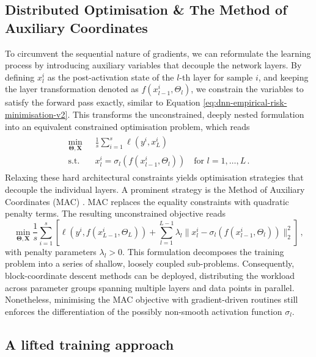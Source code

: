 \subsection{Distributed Optimisation \& The Method of Auxiliary Coordinates}
To circumvent the sequential nature of gradients, we can reformulate the learning process by introducing auxiliary variables that decouple the network layers. By defining $x_l^i$ as the post-activation state of the $l$-th layer for sample $i$, and keeping the layer transformation denoted as $f(x_{l-1}^i, \Theta_l)$, we constrain the variables to satisfy the forward pass exactly, similar to Equation \eqref{eq:dnn-empirical-risk-minimisation-v2}. This transforms the unconstrained, deeply nested formulation into an equivalent constrained optimisation problem, which reads
\begin{align}
    \begin{split}
    \min_{\mathbf{\Theta}, \mathbf{X}} \, &\frac{1}{s}\sum_{i=1}^s \ell(y^i, x_L^i) \\
    \text{s.t.} \quad &x_l^i = \sigma_l(f(x_{l-1}^i, \Theta_l)) \quad \text{for } l = 1, \ldots, L \, .
    \end{split}\label{eq:constrained_lifted_formulation}
\end{align}
Relaxing these hard architectural constraints yields optimisation strategies that decouple the individual layers. A prominent strategy is the Method of Auxiliary Coordinates (MAC) \cite{CarreiraPerpinan2014}. MAC replaces the equality constraints with quadratic penalty terms. The resulting unconstrained objective reads
\begin{equation}\label{eq:mac_qp}
    \min_{\mathbf{\Theta}, \mathbf{X}} \frac{1}{s} \sum_{i=1}^{s} \left[ \ell(y^i, f(x_{L - 1}^i, \Theta_L)) + \sum_{l=1}^{L-1} \lambda_l \|x^i_{l} - \sigma_l(f(x_{l - 1}^i, \Theta_l)) \|_2^2 \right] \, ,
\end{equation}
with penalty parameters $\lambda_l > 0$. This formulation decomposes the training problem into a series of shallow, loosely coupled sub-problems. Consequently, block-coordinate descent methods can be deployed, distributing the workload across parameter groups spanning multiple layers and data points in parallel. Nonetheless, minimising the MAC objective with gradient-driven routines still enforces the differentiation of the possibly non-smooth activation function $\sigma_l$. 

\subsection{A lifted training approach}\label{sec:lifted}

